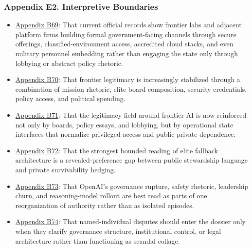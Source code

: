 \documentclass[
  american,
  11pt,
  letterpaper,
]{article}
\providecommand{\tightlist}{%
  \setlength{\itemsep}{0pt}\setlength{\parskip}{0pt}}
\begin{document}
\subsubsection{Appendix E2. Interpretive
Boundaries}\label{appendix-e2-interpretive-boundaries}

\begin{itemize}
\tightlist
\item
  \hyperref[appendix-b69-current-official-records-show-frontier-labs-and-adjacent-platform-firms-building]{Appendix
  B69}: That current official records show frontier labs and adjacent
  platform firms building formal government-facing channels through
  secure offerings, classified-environment access, accredited cloud
  stacks, and even military personnel embedding rather than engaging the
  state only through lobbying or abstract policy rhetoric.
\item
  \hyperref[appendix-b70-frontier-legitimacy-is-increasingly-stabilized-through-a-combination-of-mission-r]{Appendix
  B70}: That frontier legitimacy is increasingly stabilized through a
  combination of mission rhetoric, elite board composition, security
  credentials, policy access, and political spending.
\item
  \hyperref[appendix-b71-the-legitimacy-field-around-frontier-ai-is-now-reinforced-not-only-by-boards-pol]{Appendix
  B71}: That the legitimacy field around frontier AI is now reinforced
  not only by boards, policy essays, and lobbying, but by operational
  state interfaces that normalize privileged access and public-private
  dependence.
\item
  \hyperref[appendix-b72-the-strongest-bounded-reading-of-elite-fallback-architecture-is-a-revealed-prefer]{Appendix
  B72}: That the strongest bounded reading of elite fallback
  architecture is a revealed-preference gap between public stewardship
  language and private survivability hedging.
\item
  \hyperref[appendix-b73-openai-s-governance-rupture-safety-rhetoric-leadership-churn-and-reasoning-mod]{Appendix
  B73}: That OpenAI's governance rupture, safety rhetoric, leadership
  churn, and reasoning-model rollout are best read as parts of one
  reorganization of authority rather than as isolated episodes.
\item
  \hyperref[appendix-b74-named-individual-disputes-should-enter-the-dossier-only-when-they-clarify-governa]{Appendix
  B74}: That named-individual disputes should enter the dossier only
  when they clarify governance structure, institutional control, or
  legal architecture rather than functioning as scandal collage.
\end{itemize}
\end{document}
